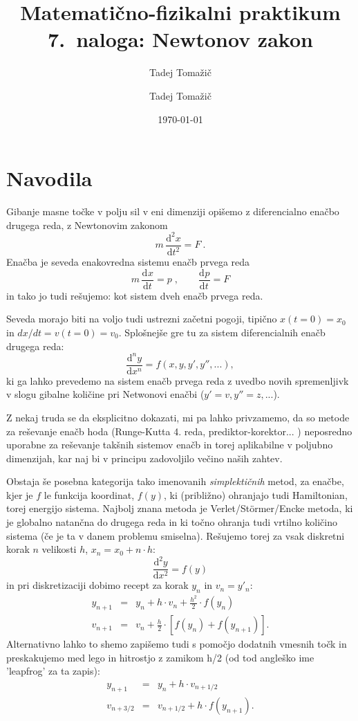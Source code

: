 \documentclass[slovene,11pt,a4paper]{article}
\title{
\sc\large Matematično-fizikalni praktikum \thisyear \\
\bigskip
\bf\Large 7.~naloga: Newtonov zakon
}
\author{Tadej Tomažič}
\date{}
\newcommand{\ddd}{\mathrm{d}}
\newcommand{\Dd}[3][{}]{\frac{\ddd^{#1} #2}{\ddd #3^{#1}}}
\begin{document}
\author{Tadej Tomažič}
\date{\today}

\maketitle

\newpage
{}
\tableofcontents
\listoffigures
\newpage
\section{Navodila}


Gibanje masne točke v polju sil v eni dimenziji opišemo
z diferencialno enačbo drugega reda, z Newtonovim zakonom
\begin{equation*}
m\, \Dd[2]{x}{t} = F \>.
\end{equation*}
Enačba je seveda enakovredna sistemu enačb prvega reda
\[
m\, \Dd{x}{t} = p \;, \qquad \Dd{p}{t} = F
\]
in tako jo tudi rešujemo: kot sistem dveh enačb prvega reda.

Seveda morajo biti na voljo tudi ustrezni začetni pogoji, tipično
$x(t=0)=x_0$ in $dx/dt=v(t=0)=v_0$. Splošnejše gre tu za sistem diferencialnih
enačb drugega reda:
\[
\Dd[n]{y}{x} = f(x,y,y',y'',...),
\]
ki ga lahko prevedemo na sistem enačb prvega reda z uvedbo novih spremenljivk v slogu
gibalne količine pri Netwonovi enačbi ($y'=v,y''=z,...$).

Z nekaj truda se da eksplicitno dokazati, mi pa lahko privzamemo, da so metode za
reševanje enačb hoda (Runge-Kutta 4. reda, prediktor-korektor... ) neposredno uporabne
za reševanje takšnih sistemov enačb in torej aplikabilne v poljubno dimenzijah, kar
naj bi v principu zadovoljilo večino naših zahtev.

Obstaja še posebna kategorija tako imenovanih \emph{simplektičnih} metod, za enačbe, kjer je $f$ le funkcija koordinat, $f(y)$, ki (približno) ohranjajo tudi Hamiltonian,
torej energijo sistema. Najbolj znana metoda je Verlet/St\"ormer/Encke metoda, ki je globalno
natančna do drugega reda in ki točno ohranja tudi vrtilno količino sistema (če je ta v danem problemu smiselna). Rešujemo torej za vsak diskretni korak $n$ velikosti $h$, $x_n=x_0+n \cdot h$:
\[
\Dd[2]{y}{x} = f(y)
\]
in pri diskretizaciji dobimo recept za korak $y_n$ in $v_n=y'_n$:
\begin{eqnarray*}
y_{n+1} &=& y_n + h \cdot v_n + \frac{h^2}{2} \cdot f(y_n) \\
v_{n+1} &=& v_n +  \frac{h}{2} \cdot \left[ f(y_n) + f(y_{n+1}) \right].
\end{eqnarray*}
Alternativno lahko to shemo zapišemo tudi s pomočjo dodatnih vmesnih točk in preskakujemo med lego in hitrostjo z zamikom h/2 (od tod angleško ime 'leapfrog' za ta zapis):
\begin{eqnarray*}
y_{n+1} &=& y_n + h \cdot v_{n+1/2} \\
v_{n+3/2} &=& v_{n+1/2} + h \cdot f(y_{n+1}).
\end{eqnarray*}
\end{document}
